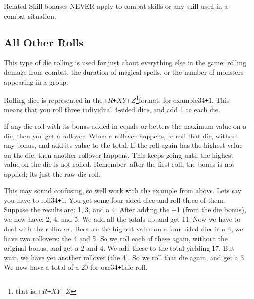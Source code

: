 \documentclass[twoside]{book}
\begin{document}
  
    {  
    Related Skill bonuses NEVER apply to combat skills or any skill used in a combat situation.
    }
  
    

\subsection{All Other Rolls}
    
    {  
    This type of die rolling is used for just about everything else in the game: rolling damage from combat, the duration of magical spells, or the number of monsters appearing in a group.
    }
  
    {  
    Rolling dice is represented in the\texttt{\ensuremath{\pm}}\ensuremath{R}\texttt{+}\ensuremath{X}\ensuremath{Y}\texttt{\ensuremath{\pm}}\ensuremath{Z}\footnote{that is,\texttt{\ensuremath{\pm}}\ensuremath{R}\texttt{+}\ensuremath{X}\ensuremath{Y}\texttt{\ensuremath{\pm}}\ensuremath{Z}}format; for example\ensuremath{3}\ensuremath{4}\texttt{+}\ensuremath{1}. This means that you roll three individual 4-sided dice, and add 1 to each die.
    }
  
    {  
    If any die roll with its bonus added in equals or betters the maximum value on a die, then you get a rollover. When a rollover happens, re-roll that die, without any bonus, and add its value to the total. If the roll again has the highest value on the die, then another rollover happens. This keeps going until the highest value on the die is not rolled. Remember, after the first roll, the bonus is not applied; its just the raw die roll.
    }
  
    {  
    This may sound confusing, so well work with the example from above. Lets say you have to roll\ensuremath{3}\ensuremath{4}\texttt{+}\ensuremath{1}. You get some four-sided dice and roll three of them. Suppose the results are: 1, 3, and a 4. After adding the +1 (from the die bonus), we now have: 2, 4, and 5. We add all the totals up and get 11. Now we have to deal with the rollovers. Because the highest value on a four-sided dice is a 4, we have two rollovers: the 4 and 5. So we roll each of these again, without the original bonus, and get a 2 and 4. We add these to the total yielding 17. But wait, we have yet another rollover (the 4). So we roll that die again, and get a 3. We now have a total of a 20 for our\ensuremath{3}\ensuremath{4}\texttt{+}\ensuremath{1}die roll.
    }
  
\end{document}
